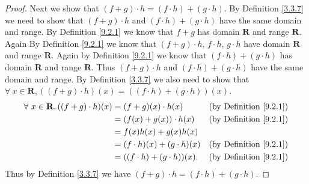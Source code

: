 \begin{proof}
    Next we show that \((f + g) \cdot h = (f \cdot h) + (g \cdot h)\).
    By Definition \ref{3.3.7} we need to show that \((f + g) \cdot h\) and \((f \cdot h) + (g \cdot h)\) have the same domain and range.
    By Definition \ref{9.2.1} we know that \(f + g\) has domain \(\mathbf{R}\) and range \(\mathbf{R}\).
    Again By Definition \ref{9.2.1} we know that \((f + g) \cdot h\), \(f \cdot h\), \(g \cdot h\) have domain \(\mathbf{R}\) and range \(\mathbf{R}\).
    Again by Definition \ref{9.2.1} we know that \((f \cdot h) + (g \cdot h)\) has domain \(\mathbf{R}\) and range \(\mathbf{R}\).
    Thus \((f + g) \cdot h\) and \((f \cdot h) + (g \cdot h)\) have the same domain and range.
    By Definition \ref{3.3.7} we also need to show that \(\forall\ x \in \mathbf{R}, ((f + g) \cdot h)(x) = ((f \cdot h) + (g \cdot h))(x)\).
    \begin{align*}
        \forall\ x \in \mathbf{R}, ((f + g) \cdot h)(x) & = (f + g)(x) \cdot h(x)           & \text{(by Definition \ref{9.2.1})} \\
                                                        & = (f(x) + g(x)) \cdot h(x)        & \text{(by Definition \ref{9.2.1})} \\
                                                        & = f(x)h(x) + g(x)h(x)                                                  \\
                                                        & = (f \cdot h)(x) + (g \cdot h)(x) & \text{(by Definition \ref{9.2.1})} \\
                                                        & = ((f \cdot h) + (g \cdot h))(x). & \text{(by Definition \ref{9.2.1})}
    \end{align*}
    Thus by Definition \ref{3.3.7} we have \((f + g) \cdot h = (f \cdot h) + (g \cdot h)\).


\end{proof}
